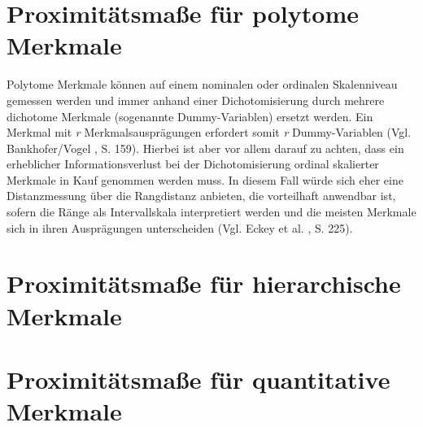 \section{Proximitätsmaße für polytome Merkmale}
Polytome Merkmale können auf einem nominalen oder ordinalen Skalenniveau gemessen werden und immer anhand einer Dichotomisierung durch mehrere dichotome Merkmale (sogenannte Dummy-Variablen) ersetzt werden. Ein Merkmal mit \textit{r} Merkmalsausprägungen erfordert somit \textit{r} Dummy-Variablen (Vgl. Bankhofer/Vogel \cite{Bankhofer.2008}, S. 159). Hierbei ist aber vor allem darauf zu achten, dass ein erheblicher Informationsverlust bei der Dichotomisierung ordinal skalierter Merkmale in Kauf genommen werden muss. In diesem Fall würde sich eher eine Distanzmessung über die Rangdistanz anbieten, die vorteilhaft anwendbar ist, sofern die Ränge als Intervallskala interpretiert werden und die meisten Merkmale sich in ihren Ausprägungen unterscheiden (Vgl. Eckey et al. \cite{Eckey.2002}, S. 225).

\section{Proximitätsmaße für hierarchische Merkmale}
\section{Proximitätsmaße für quantitative Merkmale}
